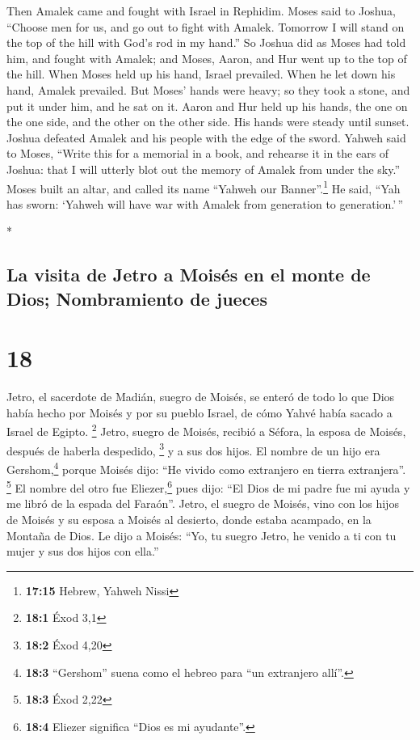 \begin{paracol}{2}
\begin{otherlanguage}{english}
 Then Amalek came and fought with Israel in Rephidim.
 Moses said to Joshua, ``Choose men for us, and go out to
fight with Amalek. Tomorrow I will stand on the top of the hill with
God's rod in my hand.''  So Joshua did as Moses had told
him, and fought with Amalek; and Moses, Aaron, and Hur went up to the
top of the hill.  When Moses held up his hand, Israel
prevailed. When he let down his hand, Amalek prevailed. 
But Moses' hands were heavy; so they took a stone, and put it under him,
and he sat on it. Aaron and Hur held up his hands, the one on the one
side, and the other on the other side. His hands were steady until
sunset.  Joshua defeated Amalek and his people with the
edge of the sword.  Yahweh said to Moses, ``Write this
for a memorial in a book, and rehearse it in the ears of Joshua: that I
will utterly blot out the memory of Amalek from under the sky.''
 Moses built an altar, and called its name ``Yahweh our
Banner''.\footnote{\textbf{17:15} Hebrew, Yahweh Nissi} 
He said, ``Yah has sworn: `Yahweh will have war with Amalek from
generation to generation.'\,''

\end{otherlanguage}

\switchcolumn[0]*

\hypertarget{la-visita-de-jetro-a-moisuxe9s-en-el-monte-de-dios-nombramiento-de-jueces}{%
\subsection{La visita de Jetro a Moisés en el monte de Dios;
Nombramiento de
jueces}\label{la-visita-de-jetro-a-moisuxe9s-en-el-monte-de-dios-nombramiento-de-jueces}}

\hypertarget{section-34}{%
\section{18}\label{section-34}}

 Jetro, el sacerdote de Madián, suegro de Moisés, se
enteró de todo lo que Dios había hecho por Moisés y por su pueblo
Israel, de cómo Yahvé había sacado a Israel de Egipto. \footnote{\textbf{18:1}
  Éxod 3,1}  Jetro, suegro de Moisés, recibió a Séfora, la
esposa de Moisés, después de haberla despedido, \footnote{\textbf{18:2}
  Éxod 4,20}  y a sus dos hijos. El nombre de un hijo era
Gershom,\footnote{\textbf{18:3} ``Gershom'' suena como el hebreo para
  ``un extranjero allí''.} porque Moisés dijo: ``He vivido como
extranjero en tierra extranjera''. \footnote{\textbf{18:3} Éxod 2,22}
 El nombre del otro fue Eliezer,\footnote{\textbf{18:4}
  Eliezer significa ``Dios es mi ayudante''.} pues dijo: ``El Dios de mi
padre fue mi ayuda y me libró de la espada del Faraón''. 
Jetro, el suegro de Moisés, vino con los hijos de Moisés y su esposa a
Moisés al desierto, donde estaba acampado, en la Montaña de Dios.
 Le dijo a Moisés: ``Yo, tu suegro Jetro, he venido a ti
con tu mujer y sus dos hijos con ella.''


\end{paracol}
